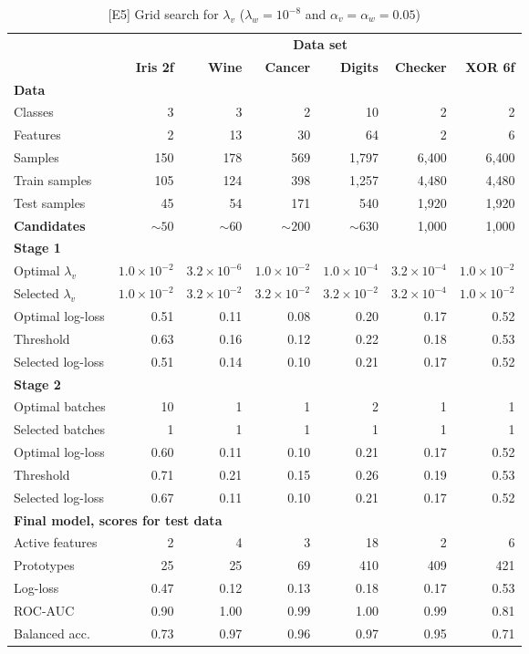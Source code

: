\begin{table}
\caption{[E5] Grid search for $\lambda_v$ ($\lambda_w=10^{-8}$ and $\alpha_v=\alpha_w=0.05$)}
\label{tab_e5}
%
\begin{center}
\small
\begin{tabular}{|lrrrrrr|}
\hline
&\multicolumn{6}{c|}{\textbf{\hrulefill\ Data set \hrulefill}}\\
&\textbf{Iris 2f}&\textbf{Wine}&\textbf{Cancer}&\textbf{Digits}&\textbf{Checker}&\textbf{XOR 6f}\\
\multicolumn{7}{|l|}{\textbf{Data}}\\
Classes&3&3&2&10&2&2\\
Features&2&13&30&64&2&6\\
Samples&150&178&569&1,797&6,400&6,400\\
Train samples&105&124&398&1,257&4,480&4,480\\
Test samples&45&54&171&540&1,920&1,920\\
\textbf{Candidates}&$\sim50$&$\sim60$&$\sim200$&$\sim630$&1,000&1,000\\
\multicolumn{7}{|l|}{\textbf{Stage 1}}\\
Optimal $\lambda_v$&$1.0\times10^{-2}$&$3.2\times10^{-6}$&$1.0\times10^{-2}$&$1.0\times10^{-4}$&$3.2\times10^{-4}$&$1.0\times10^{-2}$\\
Selected $\lambda_v$&$1.0\times10^{-2}$&$3.2\times10^{-2}$&$3.2\times10^{-2}$&$3.2\times10^{-2}$&$3.2\times10^{-4}$&$1.0\times10^{-2}$\\
Optimal log-loss&0.51&0.11&0.08&0.20&0.17&0.52\\
Threshold&0.63&0.16&0.12&0.22&0.18&0.53\\
Selected log-loss&0.51&0.14&0.10&0.21&0.17&0.52\\
\multicolumn{7}{|l|}{\textbf{Stage 2}}\\
Optimal batches&10&1&1&2&1&1\\
Selected batches&1&1&1&1&1&1\\
Optimal log-loss&0.60&0.11&0.10&0.21&0.17&0.52\\
Threshold&0.71&0.21&0.15&0.26&0.19&0.53\\
Selected log-loss&0.67&0.11&0.10&0.21&0.17&0.52\\
\multicolumn{7}{|l|}{\textbf{Final model, scores for test data}}\\
Active features&2&4&3&18&2&6\\
Prototypes&25&25&69&410&409&421\\
Log-loss&0.47&0.12&0.13&0.18&0.17&0.53\\
ROC-AUC&0.90&1.00&0.99&1.00&0.99&0.81\\
Balanced acc.&0.73&0.97&0.96&0.97&0.95&0.71\\
\hline
\end{tabular}
\end{center}
\end{table}
